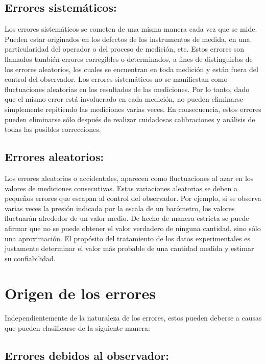 \subsection{Errores sistemáticos:}

Los errores sistemáticos se cometen de una misma manera cada vez que se mide.  Pueden estar originados en los defectos de los 
instrumentos de medida, en una particularidad del operador o del proceso de medición, etc. Estos errores son llamados también 
errores corregibles o determinados, a fines de distinguirlos de los errores aleatorios, los cuales se encuentran en toda medición 
y están fuera del control del observador. Los errores sistemáticos no se manifiestan como fluctuaciones aleatorias en los 
resultados de las mediciones. Por lo tanto, dado que el mismo error está involucrado en cada medición, no pueden eliminarse 
simplemente repitiendo las mediciones varias veces. En consecuencia, estos errores pueden eliminarse sólo después de realizar 
cuidadosas calibraciones y análisis de todas las posibles correcciones. 

\subsection{Errores aleatorios:}

Los errores aleatorios o accidentales, aparecen como fluctuaciones al azar en los valores de mediciones consecutivas. Estas 
variaciones aleatorias se deben a pequeños errores que escapan al control del observador. Por ejemplo, 
si se observa varias veces la presión indicada por la escala de un barómetro, los valores fluctuarán alrededor de un valor medio. 
De hecho de manera estricta se puede afirmar que no se puede obtener el valor verdadero de ninguna cantidad, sino sólo una 
aproximación. El propósito del tratamiento de los datos experimentales es justamente determinar el valor más probable de una 
cantidad medida y estimar su confiabilidad.

 \section{Origen de los errores}
 
Independientemente  de  la  naturaleza  de  los  errores,  estos  pueden  deberse  a  causas  que pueden clasificarse de la 
siguiente manera:

\subsection{Errores  debidos  al  observador:} 

